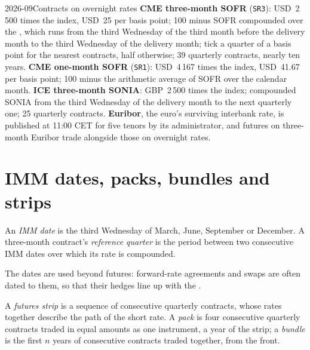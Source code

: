 \begin{dated}{2026-09}{Contracts on overnight rates}\label{dat:m2:short-term-interest-rate-futures:contracts}
\textbf{CME three-month SOFR} (\texttt{SR3}): USD~2\,500 times the index, USD~25 per
basis point; 100 minus SOFR compounded over the , which runs
from the third Wednesday of the third month before the delivery month to the
third Wednesday of the delivery month; tick a quarter of a basis point for the
nearest contracts, half otherwise; 39 quarterly contracts, nearly ten years.
\textbf{CME one-month SOFR} (\texttt{SR1}): USD~4\,167 times the index, USD~41.67 per
basis point; 100 minus the arithmetic average of SOFR over the calendar month.
\textbf{ICE three-month SONIA}: GBP~2\,500 times the index; compounded SONIA from
the third Wednesday of the delivery month to the next quarterly one; 25
quarterly contracts. \textbf{Euribor}, the euro's surviving interbank rate,
is published at 11:00 CET for five tenors by its administrator, and futures
on three-month Euribor trade alongside those on overnight rates.
\end{dated}

\section{IMM dates, packs, bundles and strips}

\begin{definition}\label{def:m2:short-term-interest-rate-futures:imm}
An \emph{IMM date} is the third Wednesday of March, June,
September or December. A three-month contract's \emph{reference
quarter} is the period between two consecutive IMM
dates over which its rate is compounded.
\end{definition}

The dates are used beyond futures: forward-rate agreements and swaps are
often dated to them, so that their hedges line up with the .

\begin{definition}\label{def:m2:short-term-interest-rate-futures:strip}
A \emph{futures strip} is a sequence of consecutive
quarterly contracts, whose rates together describe the path of the short rate.
A \emph{pack} is four consecutive quarterly contracts traded in
equal amounts as one instrument, a year of the strip; a
\emph{bundle} is the first $n$ years of consecutive contracts
traded together, from the front.
\end{definition}

